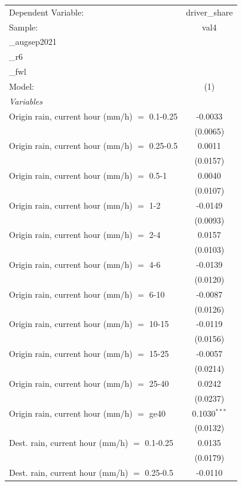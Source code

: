 \ifdefined\ifclassloaded
{}
\fi
\begingroup
\centering
\begin{tabular}{lc}
   \tabularnewline \midrule \midrule
   Dependent Variable: & driver\_share\\
   Sample: & val4\\_augsep2021\\_r6\\_fwl \\
   Model: & (1)\\
   \midrule
   \emph{Variables}\\
   Origin rain, current hour (mm/h) $=$ 0.1-0.25 & -0.0033\\
    & (0.0065)\\
   Origin rain, current hour (mm/h) $=$ 0.25-0.5 & 0.0011\\
    & (0.0157)\\
   Origin rain, current hour (mm/h) $=$ 0.5-1 & 0.0040\\
    & (0.0107)\\
   Origin rain, current hour (mm/h) $=$ 1-2 & -0.0149\\
    & (0.0093)\\
   Origin rain, current hour (mm/h) $=$ 2-4 & 0.0157\\
    & (0.0103)\\
   Origin rain, current hour (mm/h) $=$ 4-6 & -0.0139\\
    & (0.0120)\\
   Origin rain, current hour (mm/h) $=$ 6-10 & -0.0087\\
    & (0.0126)\\
   Origin rain, current hour (mm/h) $=$ 10-15 & -0.0119\\
    & (0.0156)\\
   Origin rain, current hour (mm/h) $=$ 15-25 & -0.0057\\
    & (0.0214)\\
   Origin rain, current hour (mm/h) $=$ 25-40 & 0.0242\\
    & (0.0237)\\
   Origin rain, current hour (mm/h) $=$ ge40 & 0.1030$^{***}$\\
    & (0.0132)\\
   Dest. rain, current hour (mm/h) $=$ 0.1-0.25 & 0.0135\\
    & (0.0179)\\
   Dest. rain, current hour (mm/h) $=$ 0.25-0.5 & -0.0110\\

\end{tabular}
